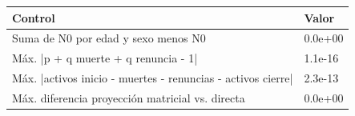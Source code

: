 \begin{tabular}{ll}
\toprule
Control & Valor \\
\midrule
Suma de N0 por edad y sexo menos N0 & 0.0e+00 \\
Máx. |p + q muerte + q renuncia - 1| & 1.1e-16 \\
Máx. |activos inicio - muertes - renuncias - activos cierre| & 2.3e-13 \\
Máx. diferencia proyección matricial vs. directa & 0.0e+00 \\
\bottomrule
\end{tabular}
